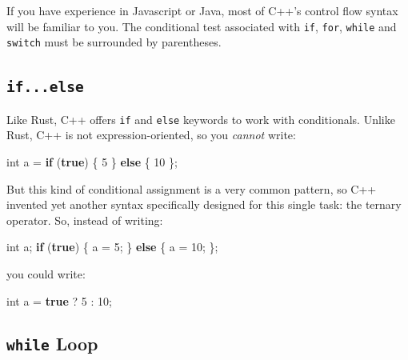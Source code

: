 \documentclass[
]{book}
\newenvironment{Shaded}{\begin{snugshade}}{\end{snugshade}}
\newcommand{\ControlFlowTok}[1]{\textcolor[rgb]{0.13,0.29,0.53}{\textbf{#1}}}
\newcommand{\DataTypeTok}[1]{\textcolor[rgb]{0.13,0.29,0.53}{#1}}
\newcommand{\DecValTok}[1]{\textcolor[rgb]{0.00,0.00,0.81}{#1}}
\newcommand{\KeywordTok}[1]{\textcolor[rgb]{0.13,0.29,0.53}{\textbf{#1}}}
\newcommand{\NormalTok}[1]{#1}
\begin{document}
If you have experience in Javascript or Java, most of C++'s control flow syntax will be familiar to you. The conditional test associated with \texttt{if}, \texttt{for}, \texttt{while} and \texttt{switch} must be surrounded by parentheses.

\hypertarget{if...else}{%
\subsection{\texorpdfstring{\texttt{if...else}}{if...else}}\label{if...else}}

Like Rust, C++ offers \texttt{if} and \texttt{else} keywords to work with conditionals. Unlike Rust, C++ is not expression-oriented, so you \emph{cannot} write:

\begin{Shaded}
\begin{Highlighting}[]
\DataTypeTok{int}\NormalTok{ a = }\ControlFlowTok{if}\NormalTok{ (}\KeywordTok{true}\NormalTok{) \{ }\DecValTok{5}\NormalTok{ \} }\ControlFlowTok{else}\NormalTok{ \{ }\DecValTok{10}\NormalTok{ \};}
\end{Highlighting}
\end{Shaded}

But this kind of conditional assignment is a very common pattern, so C++ invented yet another syntax specifically designed for this single task: the ternary operator. So, instead of writing:

\begin{Shaded}
\begin{Highlighting}[]
\DataTypeTok{int}\NormalTok{ a;}
\ControlFlowTok{if}\NormalTok{ (}\KeywordTok{true}\NormalTok{) \{ a = }\DecValTok{5}\NormalTok{; \} }\ControlFlowTok{else}\NormalTok{ \{ a = }\DecValTok{10}\NormalTok{; \};}
\end{Highlighting}
\end{Shaded}

you could write:

\begin{Shaded}
\begin{Highlighting}[]
\DataTypeTok{int}\NormalTok{ a = }\KeywordTok{true}\NormalTok{ ? }\DecValTok{5}\NormalTok{ : }\DecValTok{10}\NormalTok{;}
\end{Highlighting}
\end{Shaded}

\hypertarget{while-loop}{%
\subsection{\texorpdfstring{\texttt{while} Loop}{while Loop}}\label{while-loop}}
\end{document}
